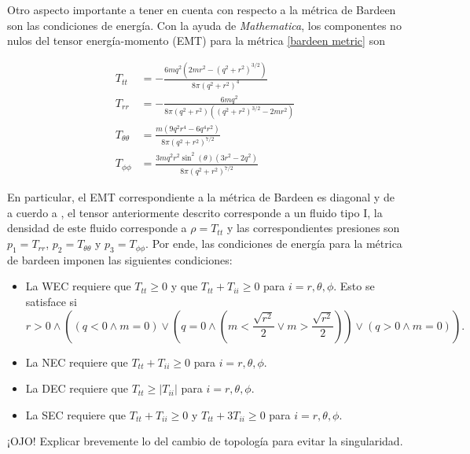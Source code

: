 \documentclass[prb,aps,preprintnumbers,amsmath,amssymb]{article}
\numberwithin{equation}{section}
\begin{document}
Otro aspecto importante a tener en cuenta con respecto a la métrica de Bardeen son las condiciones de energía. Con la ayuda de \textit{Mathematica}, los componentes no nulos del tensor energía-momento (EMT) para la métrica \eqref{bardeen metric} son

\begin{equation}
\begin{split}
T_{tt} &= -\frac{6 m q^2 \left(2 m r^2-\left(q^2+r^2\right)^{3/2}\right)}{8 \pi \left(q^2+r^2\right)^4}\\
T_{rr} &= -\frac{6 m q^2}{8 \pi \left(q^2+r^2\right) \left(\left(q^2+r^2\right)^{3/2}-2 m r^2\right)}\\
T_{\theta \theta} &= \frac{m \left(9 q^2 r^4-6 q^4 r^2\right)}{8 \pi \left(q^2+r^2\right)^{7/2}}\\
T_{\phi \phi} &= \frac{3 m q^2 r^2 \sin ^2(\theta ) \left(3 r^2-2 q^2\right)}{8 \pi \left(q^2+r^2\right)^{7/2}}
\end{split}
\end{equation}

En particular, el EMT correspondiente a la métrica de Bardeen es diagonal y de a cuerdo a \cite{hawking}, el tensor anteriormente descrito corresponde a un fluido tipo I, la densidad de este fluido corresponde a $\rho = T_{tt}$ y las correspondientes presiones son $p_{1} = T_{rr}$, $p_{2} = T_{\theta \theta}$ y $p_{3} = T_{\phi \phi}$. Por ende, las condiciones de energía para la métrica de bardeen imponen las siguientes condiciones:

\begin{itemize}
\item La WEC requiere que $T_{tt} \geq 0$ y que $T_{tt} + T_{ii} \geq 0$ para $i = r,\theta,\phi$. Esto se satisface si
\begin{equation}
r>0\land \left((q<0\land m=0)\lor \left(q=0\land \left(m<\frac{\sqrt{r^2}}{2}\lor m>\frac{\sqrt{r^2}}{2}\right)\right)\lor (q>0\land m=0)\right).
\end{equation}
\item La NEC requiere que $T_{tt} + T_{ii} \geq 0$ para $i = r,\theta,\phi$.
\item La DEC requiere que $T_{tt} \geq |T_{ii}|$ para $i = r,\theta,\phi$.
\item La SEC requiere que $T_{tt} + T_{ii} \geq 0$ y $T_{tt} + 3T_{ii} \geq 0$ para $i = r,\theta,\phi$.
\end{itemize}


¡OJO! Explicar brevemente lo del cambio de topología para evitar la singularidad.\\
\end{document}
